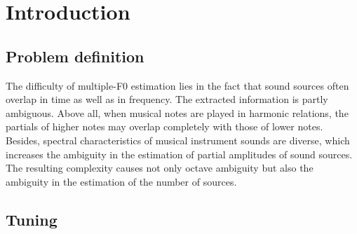 \chapter{Introduction}\label{ch:introduction}


\section{Problem definition}\label{sec:problem-definition}



The difficulty of multiple-F0 estimation lies in the fact that sound sources often overlap in time as well as in frequency. The extracted information is partly ambiguous.
Above all, when musical notes are played in harmonic relations, the partials of higher
notes may overlap completely with those of lower notes. Besides, spectral characteristics of musical instrument sounds are diverse, which increases the ambiguity in the
estimation of partial amplitudes of sound sources. The resulting complexity causes
not only octave ambiguity but also the ambiguity in the estimation of the number of
sources.


\section{Tuning}\label{sec:tuning}
